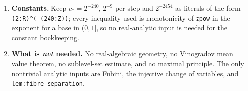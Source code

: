\documentclass[11pt]{article}
\begin{document}
\begin{enumerate}[label=\textbf{L\arabic*.}]
    primitive.  (I have not verified the current Mathlib names for the
    change-of-variables lemmas; they should be checked against the version in use.)
  \item \textbf{Constants.}  Keep $c_\ast=2^{-240}$, $2^{-9}$ per step and
    $2^{-2454}$ as literals of the form \texttt{(2:R)\^{}(-(240:Z))}; every
    inequality used is monotonicity of \texttt{zpow} in the exponent for a base in
    $(0,1]$, so no real-analytic input is needed for the constant bookkeeping.
  \item \textbf{What is \emph{not} needed.}  No real-algebraic geometry, no
    Vinogradov mean value theorem, no sublevel-set estimate, and no maximal
    principle.  The only nontrivial analytic inputs are Fubini, the injective
    change of variables, and \texttt{lem:fibre-separation}.
\end{enumerate}
\end{document}
